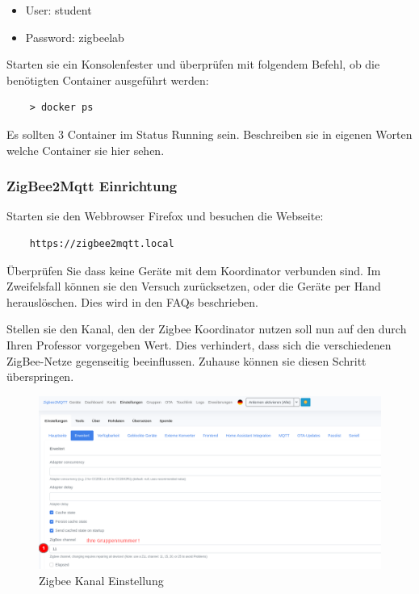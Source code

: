\begin{itemize}
    \item User: student 
    \item Password: zigbeelab
\end{itemize}

Starten sie ein Konsolenfester und überprüfen mit folgendem Befehl, ob die benötigten Container ausgeführt werden:
\begin{lstlisting}
    > docker ps
\end{lstlisting}

Es sollten 3 Container im Status \grqq Running\grqq{} sein. Beschreiben sie in eigenen Worten welche Container sie hier sehen.

\subsubsection{ZigBee2Mqtt Einrichtung}
Starten sie den Webbrowser Firefox und besuchen die Webseite:
\begin{lstlisting}
    https://zigbee2mqtt.local
\end{lstlisting}

Überprüfen Sie  dass keine Geräte mit dem Koordinator verbunden sind. Im Zweifelsfall können sie den Versuch zurücksetzen, oder die Geräte per Hand
herauslöschen.
Dies wird in den FAQs beschrieben.

Stellen sie den Kanal, den der Zigbee Koordinator nutzen soll nun auf den durch Ihren Professor vorgegeben Wert.
Dies verhindert, dass sich die verschiedenen ZigBee-Netze gegenseitig beeinflussen. Zuhause können sie diesen Schritt überspringen.

\begin{figure}[H]
    \centering
    \includegraphics[width=1\textwidth]{media/Z2M-Channel.png}
    \caption{Zigbee Kanal Einstellung}
\end{figure}

